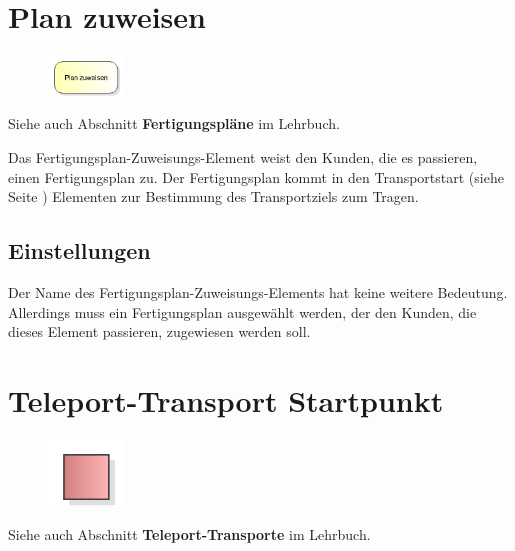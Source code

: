 \section{Plan zuweisen}
\label{ref:ModelElementAssignSequence}

\begin{figure}
\vspace{-22pt}
\includegraphics[width=2cm]{imageModelElementAssignSequence.png}
\vspace{-22pt}
\end{figure}

Siehe auch Abschnitt \textbf{Fertigungspläne} im Lehrbuch.

Das Fertigungsplan-Zuweisungs-Element weist den Kunden, die es passieren, einen Fertigungsplan zu.
Der Fertigungsplan kommt in den Transportstart (siehe Seite \pageref{ref:ModelElementTransportSource}) 
Elementen zur Bestimmung des Transportziels zum Tragen.

\subsection*{Einstellungen}

Der Name des Fertigungsplan-Zuweisungs-Elements hat keine weitere Bedeutung. Allerdings muss ein Fertigungsplan
ausgewählt werden, der den Kunden, die dieses Element passieren, zugewiesen werden soll.


\section{Teleport-Transport Startpunkt}
\label{ref:ModelElementTeleportSource}

\begin{figure}
\vspace{-22pt}
\includegraphics[width=2cm]{imageModelElementTeleportSource.png}
\vspace{-22pt}
\end{figure}

Siehe auch Abschnitt \textbf{Teleport-Transporte} im Lehrbuch.

